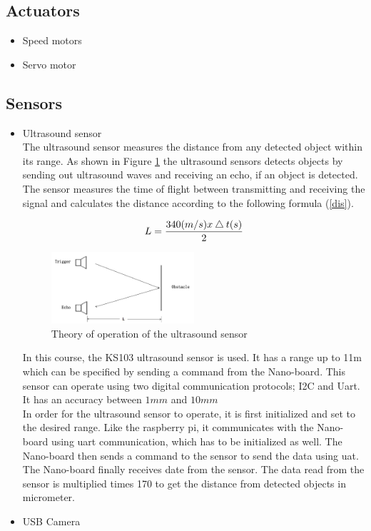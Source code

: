 \documentclass[11pt,twocolumn]{article}
\begin{document}
\subsection{Actuators}
\begin{itemize}
	\item{Speed motors}
	\item{Servo motor}
\end{itemize}
\subsection{Sensors} 
\begin{itemize}
	\item{Ultrasound sensor} \\
	The ultrasound sensor measures the distance from any detected object within its range. As shown in Figure \ref{ultrasound} the ultrasound sensors detects objects by sending out ultrasound waves and receiving an echo, if an object is detected. The sensor measures the time of flight between transmitting and receiving the signal and calculates the distance according to the following formula (\ref{dis}).
	
\begin{equation}
\centering
L = \frac{340(m/s)x\bigtriangleup t(s)}{2}
\label{dis}
\end{equation}

\begin{figure}[h]
\centering
\includegraphics[width=0.5\textwidth]{ultrasound.png}
\caption{Theory of operation of the ultrasound sensor}
\label{ultrasound}
\end{figure}

In this course, the KS103 ultrasound sensor is used. It has a range up to 11m which can be specified by sending a command from the Nano-board. This sensor can operate using two digital communication protocols; I2C and Uart. It has an accuracy between $1mm$ and $10mm$\\
In order for the ultrasound sensor to operate, it is first initialized and set to the desired range. Like the raspberry pi, it communicates with the Nano-board using uart communication, which has to be initialized as well. The Nano-board then sends a command to the sensor to send the data using uat. The Nano-board finally receives date from the sensor. The data read from the sensor is multiplied times 170 to get the distance from detected objects in micrometer.  
	\item{USB Camera}
\end{itemize}
\end{document}
